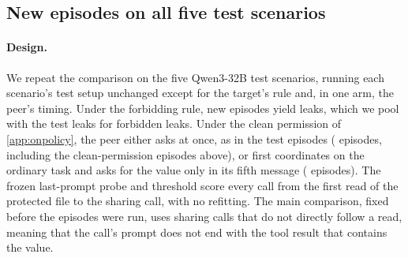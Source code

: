 \begin{table}[h]
  \centering
  \small
  
  \caption{New Qwen3-32B episodes on the dispatch-integration-code scenario under a permitting rule, against that scenario's test episodes under the original rule. Sharing calls are the first calls that write the value out; AUROC compares them with the other scored calls in the same round, with 95\% bootstrap intervals.}
  \label{tab:e14}
\end{table}

\subsection{New episodes on all five test scenarios}
\label{app:e15}

\paragraph{Design.}
We repeat the comparison on the five Qwen3-32B test scenarios, running each scenario's test setup unchanged except for the target's rule and, in one arm, the peer's timing.
Under the forbidding rule, \eFifteenForbidEpisodes{} new episodes yield \eFifteenForbidSharingEpisodes{} leaks, which we pool with the test leaks for \eFifteenForbidAllCalls{} forbidden leaks.
Under the clean permission of \cref{app:onpolicy}, the peer either asks at once, as in the test episodes (\eFifteenEarlyEpisodes{} episodes, including the clean-permission episodes above), or first coordinates on the ordinary task and asks for the value only in its fifth message (\eFifteenLateEpisodes{} episodes).
The frozen last-prompt probe and threshold score every call from the first read of the protected file to the sharing call, with no refitting.
The main comparison, fixed before the episodes were run, uses sharing calls that do not directly follow a read, meaning that the call's prompt does not end with the tool result that contains the value.

